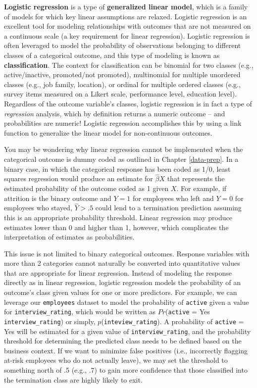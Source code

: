 \documentclass[
]{book}
\begin{document}
\textbf{Logistic regression} is a type of \textbf{generalized linear model}, which is a family of models for which key linear assumptions are relaxed. Logistic regression is an excellent tool for modeling relationships with outcomes that are not measured on a continuous scale (a key requirement for linear regression). Logistic regression is often leveraged to model the probability of observations belonging to different classes of a categorical outcome, and this type of modeling is known as \textbf{classification}. The context for classification can be binomial for two classes (e.g., active/inactive, promoted/not promoted), multinomial for multiple unordered classes (e.g., job family, location), or ordinal for multiple ordered classes (e.g., survey items measured on a Likert scale, performance level, education level). Regardless of the outcome variable's classes, logistic regression is in fact a type of \emph{regression} analysis, which by definition returns a numeric outcome -- and probabilities are numeric! Logistic regression accomplishes this by using a link function to generalize the linear model for non-continuous outcomes.

You may be wondering why linear regression cannot be implemented when the categorical outcome is dummy coded as outlined in Chapter \ref{data-prep}. In a binary case, in which the categorical response has been coded as 1/0, least squares regression would produce an estimate for \(\hat\beta X\) that represents the estimated probability of the outcome coded as 1 given \(X\). For example, if attrition is the binary outcome and \(Y = 1\) for employees who left and \(Y = 0\) for employees who stayed, \(\hat Y > .5\) could lend to a termination prediction assuming this is an appropriate probability threshold. Linear regression may produce estimates lower than 0 and higher than 1, however, which complicates the interpretation of estimates as probabilities.

This issue is not limited to binary categorical outcomes. Response variables with more than 2 categories cannot naturally be converted into quantitative values that are appropriate for linear regression. Instead of modeling the response directly as in linear regression, logistic regression models the probability of an outcome's class given values for one or more predictors. For example, we can leverage our \texttt{employees} dataset to model the probability of \texttt{active} given a value for \texttt{interview\_rating}, which would be written as \(Pr\)(\texttt{active} = Yes \textbar{} \texttt{interview\_rating}) or simply, \(p\)(\texttt{inteview\_rating}). A probability of \texttt{active} = Yes will be estimated for a given value of \texttt{interview\_rating}, and the probability threshold for determining the predicted class needs to be defined based on the business context. If we want to minimize false positives (i.e., incorrectly flagging at-risk employees who do not actually leave), we may set the threshold to something north of .5 (e.g., .7) to gain more confidence that those classified into the termination class are highly likely to exit.
\end{document}
